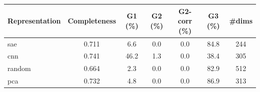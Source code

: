\begin{tabular}{lcccccc}
\toprule
Representation & Completeness & G1 (\%) & G2 (\%) & G2-corr (\%) & G3 (\%) & \#dims \\
\midrule
sae & 0.711 & 6.6 & 0.0 & 0.0 & 84.8 & 244 \\
cnn & 0.741 & 46.2 & 1.3 & 0.0 & 38.4 & 305 \\
random & 0.664 & 2.3 & 0.0 & 0.0 & 82.9 & 512 \\
pca & 0.732 & 4.8 & 0.0 & 0.0 & 86.9 & 313 \\
\bottomrule
\end{tabular}